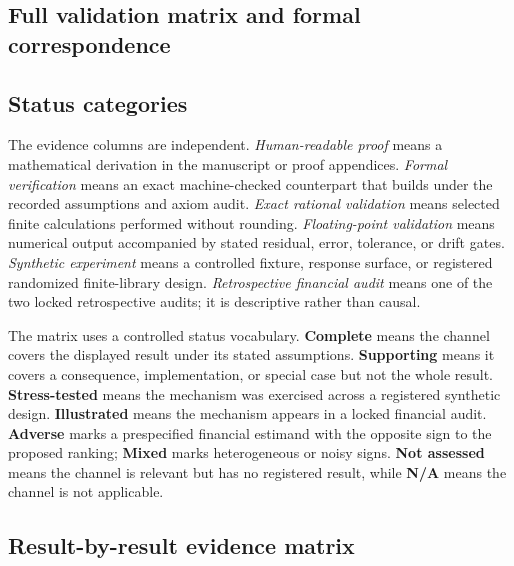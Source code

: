 \clearpage
\begin{landscape}
\section{Full validation matrix and formal correspondence}
\label{supp:validation-matrix}

\subsection{Status categories}

\begingroup
\footnotesize
The evidence columns are independent.  \emph{Human-readable proof} means a
mathematical derivation in the manuscript or proof appendices.  \emph{Formal
verification} means an exact machine-checked counterpart that builds under
the recorded assumptions and axiom audit.  \emph{Exact rational validation}
means selected finite calculations performed without rounding.
\emph{Floating-point validation} means numerical output accompanied by stated
residual, error, tolerance, or drift gates.  \emph{Synthetic experiment}
means a controlled fixture, response surface, or registered randomized
finite-library design.  \emph{Retrospective financial audit} means one of the two
locked retrospective audits; it is descriptive rather than causal.

The matrix uses a controlled status vocabulary.  \textbf{Complete} means the
channel covers the displayed result under its stated assumptions.
\textbf{Supporting} means it covers a consequence, implementation, or special
case but not the whole result.  \textbf{Stress-tested} means the mechanism was
exercised across a registered synthetic design.  \textbf{Illustrated} means
the mechanism appears in a locked financial audit.  \textbf{Adverse} marks a
prespecified financial estimand with the opposite sign to the proposed
ranking; \textbf{Mixed} marks heterogeneous or noisy signs.
\textbf{Not assessed} means the channel is relevant but has no registered
result, while \textbf{N/A} means the channel is not applicable.
\endgroup

\subsection{Result-by-result evidence matrix}


\end{landscape}
